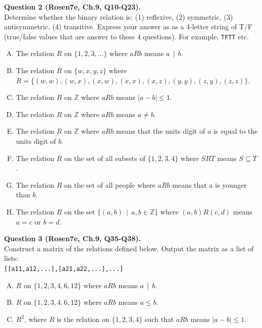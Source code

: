 \documentclass[jou]{apa6}
\begin{document}
\vspace{6pt}
{\bf Question 2 (Rosen7e, Ch.9, Q10-Q23).}\\
Determine whether the binary relation is: (1) reflexive, (2) symmetric, (3) antisymmetric, (4) transitive.
Express your answer as as a 4-letter string of T/F (true/false values that are 
answer to these $4$ questions). For example, {\tt TFTT} etc.
\begin{enumerate}[(A)]
\item The relation $R$ on $\{1, 2, 3,\ldots\}$ where $aRb$ means $a\,\mid\,b$.
\item The relation $R$ on $\{w, x, y, z\}$ where $R = \{(w, w), (w, x), (x, w), (x, x), (x, z), (y, y), (z, y), (z, z)\}$.
\item The relation $R$ on $\mathbb{Z}$ where $aRb$ means $|a - b| \leq 1$.
\item The relation $R$ on $\mathbb{Z}$ where $aRb$ means $a \neq b$.
\item The relation $R$ on $\mathbb{Z}$ where $aRb$ means that the units digit of $a$ is equal to the units digit of $b$.
\item The relation $R$ on the set of all subsets of $\{1, 2, 3, 4\}$ where $SRT$ means $S \subseteq T$.
\item The relation $R$ on the set of all people where $aRb$ means that a is younger than $b$.
\item The relation $R$ on the set $\{(a, b) \,\mid\, a, b \in \mathbb{Z}\}$ where $(a, b)R (c, d)$ means $a = c$ or $b = d$.
\end{enumerate}

\vspace{6pt}
{\bf Question 3 (Rosen7e, Ch.9, Q35-Q38).}\\
Construct a matrix of the relations defined below. Output the matrix as a list of lists:\\
{\tt [[a11,a12,...],[a21,a22,...],...]}
\begin{enumerate}[(A)]
\item $R$ on $\{1, 2, 3, 4, 6, 12\}$ where $aRb$ means $a\,\mid\,b$.
\item $R$ on $\{1, 2, 3, 4, 6, 12\}$ where $aRb$ means $a \leq b$.
\item $R^2$, where $R$ is the relation on $\{1, 2, 3, 4\}$ such that $aRb$ 
means $|a - b| \leq 1$.
\end{enumerate}
\end{document}
